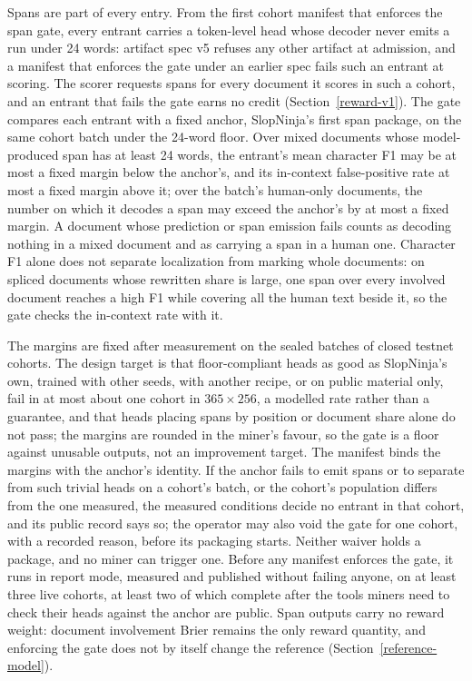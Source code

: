 Spans are part of every entry. From the first cohort manifest that enforces
the span gate, every entrant carries a token-level head whose decoder never
emits a run under 24 words: artifact spec v5 refuses any other artifact at
admission, and a manifest that enforces the gate under an earlier spec fails
such an entrant at scoring. The scorer requests spans for every document it
scores in such a cohort, and an entrant that fails the gate earns no credit
(Section~\ref{reward-v1}). The gate compares each entrant with a fixed
anchor, SlopNinja's first span package, on the same cohort batch under the
24-word floor. Over mixed documents whose model-produced span has at least 24
words, the entrant's mean character F1 may be at most a fixed margin below the
anchor's, and its in-context false-positive rate at most a fixed margin above
it; over the batch's human-only documents, the number on which it decodes a
span may exceed the anchor's by at most a fixed margin. A document whose
prediction or span emission fails counts as decoding nothing in a mixed
document and as carrying a span in a human one. Character F1 alone does not
separate localization from marking whole documents: on spliced documents whose
rewritten share is large, one span over every involved document reaches a high
F1 while covering all the human text beside it, so the gate checks the
in-context rate with it.

The margins are fixed after measurement on the sealed batches of closed testnet
cohorts. The design target is that floor-compliant heads as good as
SlopNinja's own, trained with other seeds, with another recipe, or on public
material only, fail in at most about one cohort in \(365\times256\), a
modelled rate rather than a guarantee, and that heads placing spans by position
or document share alone do not pass; the margins are rounded in the miner's
favour, so the gate is a floor against unusable outputs, not an improvement
target. The manifest binds the margins with the anchor's identity. If the
anchor fails to emit spans or to separate from such trivial heads on a cohort's
batch, or the cohort's population differs from the one measured, the measured
conditions decide no entrant in that cohort, and its public record says so;
the operator may also void the gate for one cohort, with a recorded reason,
before its packaging starts. Neither waiver holds a package, and no miner can
trigger one. Before any manifest enforces the gate, it runs in report mode,
measured and published without failing anyone, on at least three live cohorts,
at least two of which complete after the tools miners need to check their
heads against the anchor are public. Span outputs carry no reward weight:
document involvement Brier remains the only reward quantity, and enforcing the
gate does not by itself change the reference (Section~\ref{reference-model}).

